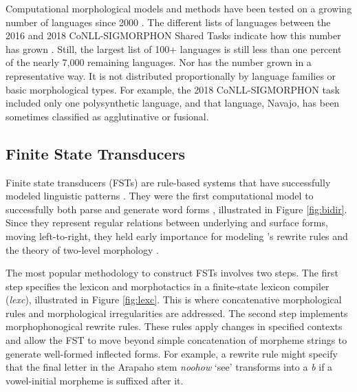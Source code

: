 \documentclass[12pt]{article}
\begin{document}
Computational morphological models and methods have been tested on a growing number of languages since 2000 \cite{hammarstrom_unsupervised_2011}. The different lists of languages between the 2016 and 2018 CoNLL-SIGMORPHON Shared Tasks indicate how this number has grown \cite{cotterell-etal-2016-sigmorphon,cotterell_cross-lingual_2017,cotterell_conllsigmorphon_2018}. Still, the largest list of 100+ languages is still less than one percent of the nearly 7,000 remaining languages. Nor has the number grown in a representative way. It is not distributed proportionally by language families or basic morphological types. For example, the 2018 CoNLL-SIGMORPHON task included only one polysynthetic language, and that language, Navajo, has been sometimes classified as agglutinative or fusional.


\subsection{Finite State Transducers}
\label{sec:FSTs}

Finite state transducers (FSTs) are rule-based systems that have successfully modeled linguistic patterns \cite{koskenniemi_two-level_1983,beesley_finite-state_2003,hulden_finite-state_2009}. They were the first computational model to successfully both parse and generate word forms \cite{goodman_generation_2013}, illustrated in Figure \ref{fig:bidir}. Since they represent regular relations between underlying and surface forms, moving left-to-right, they held early importance for modeling 's  rewrite rules and the theory of two-level morphology \cite{karttunen_2005}.
\bigskip

The most popular methodology to construct FSTs involves two steps. The first step specifies the lexicon and morphotactics in a finite-state lexicon compiler ({\it lexc}), illustrated in Figure \ref{fig:lexc}. This is where concatenative morphological rules and morphological irregularities are addressed. The second step implements morphophonogical rewrite rules. These rules apply changes in specified contexts and allow the FST to move beyond simple concatenation of morpheme strings to generate well-formed inflected forms. For example, a rewrite rule might specify that the final letter in the Arapaho stem \textit{noohow} `see' transforms into a \textit{b} if a vowel-initial morpheme is suffixed after it.
\bigskip
\end{document}
